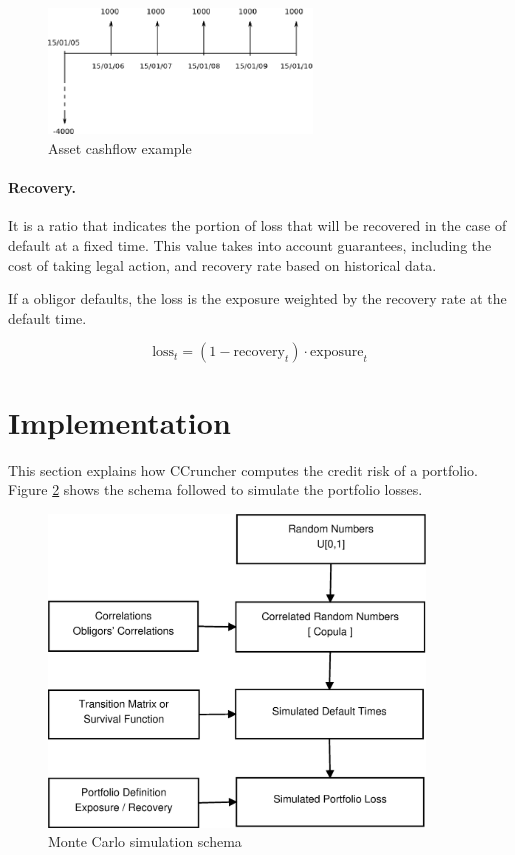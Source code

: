 \documentclass[a4paper,12pt,final]{article}
\begin{document}
\begin{figure}[!hbt]
\begin{center}
\includegraphics[width=7cm, angle=0]{./images/cashflow.eps}
\caption{Asset cashflow example}
\label{cashflow}
\end{center}
\end{figure}
\FloatBarrier

\paragraph{Recovery.} It is a ratio that indicates the portion of loss that will be recovered
in the case of default at a fixed time. This value takes into account guarantees, including 
the cost of taking legal action, and recovery rate based on historical data.
\newline

If a obligor defaults, the loss is the exposure weighted by the recovery rate at the 
default time.

\begin{displaymath}
\mathrm{loss}_{t} = (1 - \mathrm{recovery}_t) \cdot \mathrm{exposure}_t
\end{displaymath}

\FloatBarrier

\clearpage
\section{Implementation}

This section explains how CCruncher computes the credit risk of a portfolio.
Figure \ref{fig:mcschema1} shows the schema followed to simulate the 
portfolio losses.

\begin{figure}[!hb]
\begin{center}
\includegraphics[width=10cm,angle=0]{./images/esquema1.eps}
\caption{Monte Carlo simulation schema}
\label{fig:mcschema1}
\end{center}
\end{figure}
\end{document}
